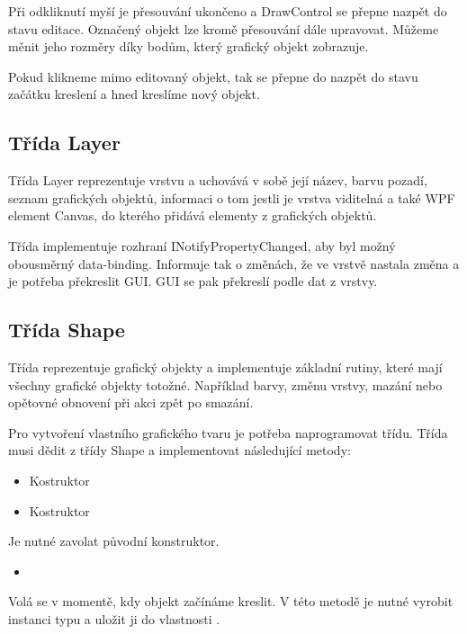 \documentclass[
  field=inf,
  biblatex,
  glossaries,
  index
]{kidiplom}
\begin{document}
Při odkliknutí myší je přesouvání ukončeno a DrawControl se přepne nazpět do stavu editace. Označený objekt lze kromě přesouvání dále upravovat. Můžeme měnit jeho rozměry díky bodům, který grafický objekt zobrazuje.

Pokud klikneme mimo editovaný objekt, tak se přepne do nazpět do stavu začátku kreslení a hned kreslíme nový objekt.

\subsection{Třída Layer}

Třída Layer reprezentuje vrstvu a uchovává v sobě její název, barvu pozadí, seznam grafických objektů, informaci o tom jestli je vrstva viditelná a také WPF element Canvas, do kterého přidává elementy z grafických objektů. 

Třída implementuje rozhraní INotifyPropertyChanged, aby byl možný obousměrný data-binding. Informuje tak o změnách, že ve vrstvě nastala změna a je potřeba překreslit GUI. GUI se pak překreslí podle dat z vrstvy.

\subsection{Třída Shape}

Třída reprezentuje grafický objekty a implementuje základní rutiny, které mají všechny grafické objekty totožné. Například barvy, změnu vrstvy, mazání nebo opětovné obnovení při akci zpět po smazání.

Pro vytvoření vlastního grafického tvaru je potřeba naprogramovat třídu. Třída musi dědit z třídy Shape a implementovat následující metody:

\begin{itemize}
\item Kostruktor 
\item Kostruktor 
\end{itemize}
Je nutné zavolat původní konstruktor.

\begin{itemize}
\item {}
\end{itemize}
Volá se v momentě, kdy objekt začínáme kreslit. V této metodě je nutné vyrobit instanci typu  a uložit ji do vlastnosti .
\end{document}
